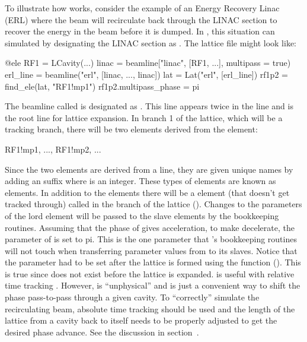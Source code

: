 To illustrate how  works, consider the example of an Energy Recovery Linac (ERL) where
the beam will recirculate back through the LINAC section to recover the energy in the beam before it
is dumped. In \accellat, this situation can simulated by designating the LINAC section as .
The lattice file might look like:
\begin{example}
  @ele RF1 = LCavity(...)
  linac = beamline["linac", [RF1, ...], multipass = true)
  erl_line = beamline("erl", [linac, ..., linac])
  lat = Lat("erl", [erl_line])
  rf1p2 = find_ele(lat, "RF1!mp1")
  rf1p2.multipass_phase = pi
\end{example}
The beamline called  is designated as . This  line appears twice in
the line  and  is the root line for lattice expansion. 
In branch 1 of the 
lattice, which will be a tracking branch, there will be two elements derived from the  element:
\begin{example}
  RF1!mp1, ..., RF1!mp2, ...
\end{example}
Since the two elements are derived from a  line, they are given unique names by adding
an  suffix where  is an integer. 
These types of elements are known as  elements. In
addition to the  elements there will be a  element (that doesn't
get tracked through) called  in the  branch of the lattice ().
Changes to the parameters of the lord  element will be passed to the slave elements by the \accellat
bookkeeping routines. Assuming that the phase of  gives acceleration, to make 
decelerate, the  parameter of  is set to pi. This is the one parameter
that \accellat's bookkeeping routines will not touch when transferring parameter values from  to
its slaves. Notice that the  parameter had to be set after the lattice is formed
using the  function (). This is true since 
 does not exist before the lattice is expanded.  is useful with
relative time tracking . However,  is ``unphysical'' and is just
a convenient way to shift the phase pass-to-pass through a given cavity. To ``correctly'' simulate
the recirculating beam, absolute time tracking should be used and the length of the lattice from a
cavity back to itself needs to be properly adjusted to get the desired phase advance. See the discussion
in section~.

